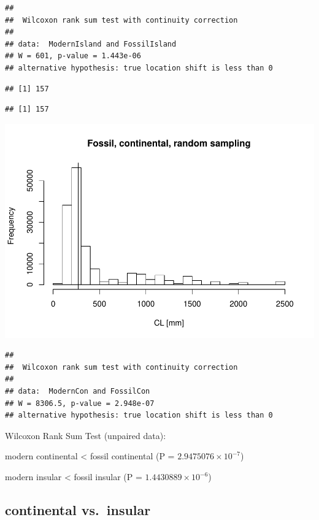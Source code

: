\documentclass[]{article}
\begin{document}
\begin{verbatim}
## 
##  Wilcoxon rank sum test with continuity correction
## 
## data:  ModernIsland and FossilIsland
## W = 601, p-value = 1.443e-06
## alternative hypothesis: true location shift is less than 0
\end{verbatim}

\begin{verbatim}
## [1] 157
\end{verbatim}

\begin{verbatim}
## [1] 157
\end{verbatim}

\includegraphics{MA_JJ_files/figure-latex/RSMFCI-2.pdf}

\begin{verbatim}
## 
##  Wilcoxon rank sum test with continuity correction
## 
## data:  ModernCon and FossilCon
## W = 8306.5, p-value = 2.948e-07
## alternative hypothesis: true location shift is less than 0
\end{verbatim}

Wilcoxon Rank Sum Test (unpaired data):

modern continental \textless{} fossil continental (P =
\(2.9475076\times 10^{-7}\))

modern insular \textless{} fossil insular (P =
\(1.4430889\times 10^{-6}\))

\newpage

\subsection{continental vs.~insular}\label{continental-vs.insular-1}
\end{document}

